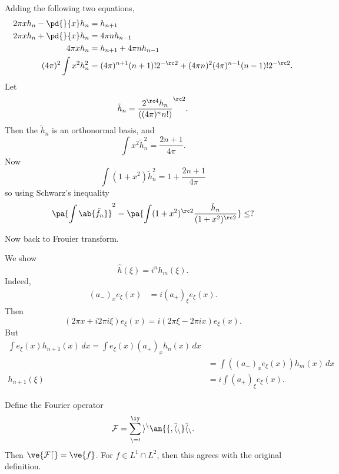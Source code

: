 Adding the following two equations,
\begin{align*}
2\pi xh_n-\pd{}{x}h_n&=h_{n+1}\\
2\pi xh_n+\pd{}{x}h_n&=4\pi n h_{n-1}\\
4\pi x h_n&=h_{n+1} + 4\pi n h_{n-1}\\
(4\pi)^2 \int x^2 h_n^2&= (4\pi)^{n+1} (n+1)! 2^{-\rc 2} + (4\pi n)^2 (4\pi)^{n-1} (n-1)! 2^{-\rc 2}.
\end{align*}
Let 
\[
\tilde{h}_n=\frac{2^{\rc 4} h_n}{((4\pi)^n n!)}^{\rc 2}.
\]
Then the $\tilde{h}_n$ is an orthonormal basis, and 
\[
\int x^2 \tilde{h}_n^2=\frac{2n+1}{4\pi}.
\]
Now
\[
\int(1+x^2)\tilde{h}_n^2=1+\frac{2n+1}{4\pi}
\]
so using Schwarz's inequality
\[
\pa{\int \ab{\tilde{f}_n}}^2=\pa{\int (1+x^2)^{\rc 2}\frac{\tilde h_n}{(1+x^2)^{\rc 2}}}\le ?
\]

Now back to Frouier transform. %

We show \[\hat h(\xi)=i^n h_m(\xi).\]
Indeed,
\begin{align*}
(a_-)_xe_{\xi}(x)&=i(a_+)_\xi e_{\xi}(x).
\end{align*}
Then
\[
(2\pi x+i2\pi i \xi)e_{\xi}(x) 
=i(2\pi \xi -2\pi i x) e_{\xi}(x).
\]
But
\begin{align*}
\int e_{\xi}(x)h_{n+1}(x) \,dx=
\int e_{\xi}(x)(a_+)_x h_n (x)\,dx\\
&=\int ((a_-)_x e_\xi(x)) h_m(x)\,dx\\
h_{n+1}(\xi)&=i\int (a_+)_{\xi} e_{\xi}(x).
\end{align*}

Define the Fourier operator
\[
\cal F =\sum_{n=0}^{\iy} i^n \an{f,\tilde h_n}\tilde{h}_n.
\]
Then $\ve{\cal Fd}=\ve{f}$. For $f\in L^1\cap L^2$, then this agrees with the original definition.